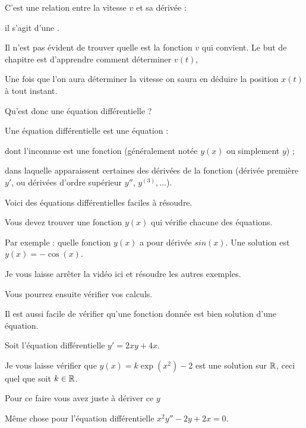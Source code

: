 \change
C'est une relation entre la vitesse $v$ et sa dérivée : 

\change
il s'agit d'une .

\change
Il n'est pas évident de trouver quelle est la fonction $v$ qui convient.
Le but de chapitre est d'apprendre comment déterminer $v(t)$, 

\change
Une fois que l'on aura déterminer la vitesse on saura 
en déduire la position $x(t)$ à tout instant.


\diapo

Qu'est donc une équation différentielle ?

Une équation différentielle est une équation :

\change
dont l'inconnue est une fonction (généralement notée $y(x)$ ou simplement $y$) ;

\change

dans laquelle apparaissent certaines des dérivées de la
  fonction (dérivée première $y'$, ou dérivées d'ordre supérieur $y''$, $y^{(3)},...$).


\diapo

Voici des équations différentielles faciles à résoudre.


Vous devez trouver une fonction $y(x)$
qui vérifie chacune des équations.

Par exemple : quelle fonction $y(x)$
a pour dérivée $sin(x)$. Une solution est $y(x)=-\cos(x)$.

Je vous laisse arrêter la vidéo ici et résoudre les autres exemples.

\change
Vous pourrez ensuite vérifier vos calculs.




\diapo


Il est aussi facile de vérifier qu'une fonction donnée est bien solution d'une équation.

Soit l'équation différentielle $y' = 2xy+4x$.

\change
Je vous laisse vérifier que $y(x)=k\exp(x^2)-2$ est une solution sur $\mathbb{R}$, 
ceci quel que soit $k\in \mathbb{R}$.

Pour ce faire vous avez juste à dériver ce $y$
  
\change 

Même chose pour l'équation différentielle $x^2y''-2y+2x=0$.

